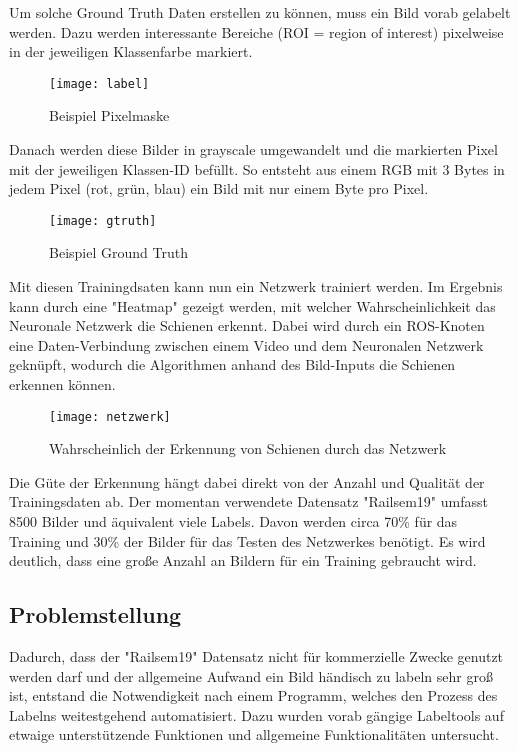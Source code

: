 \documentclass[11pt]{scrartcl}
\begin{document}
\noindent 
Um solche Ground Truth Daten erstellen zu können, muss ein Bild vorab gelabelt werden.  Dazu werden interessante Bereiche (ROI = region of interest) pixelweise in der jeweiligen Klassenfarbe markiert.

\begin{figure}[H]
  \texttt{[image: label]}
  \caption{Beispiel Pixelmaske}
\end{figure}
\newpage
\noindent 
Danach werden diese Bilder in grayscale umgewandelt und die markierten Pixel mit der jeweiligen Klassen-ID befüllt. So entsteht aus einem RGB mit 3 Bytes in jedem Pixel (rot, grün, blau) ein Bild mit nur einem Byte pro Pixel.

\begin{figure}[H]
  \texttt{[image: gtruth]}
  \caption{Beispiel Ground Truth}
\end{figure}
\noindent 
Mit diesen Trainingdsaten kann nun ein Netzwerk trainiert werden.
Im Ergebnis kann durch eine "Heatmap" gezeigt werden, mit welcher Wahrscheinlichkeit das Neuronale Netzwerk die Schienen erkennt. Dabei wird durch ein ROS-Knoten eine Daten-Verbindung zwischen einem Video und dem Neuronalen Netzwerk geknüpft, wodurch die Algorithmen anhand des Bild-Inputs die Schienen erkennen können.
\begin{figure}[H]
  \texttt{[image: netzwerk]}
  \caption{Wahrscheinlich der Erkennung von Schienen durch das Netzwerk}
\end{figure}
\noindent 
Die Güte der Erkennung hängt dabei direkt von der Anzahl und Qualität der Trainingsdaten ab. Der momentan verwendete Datensatz "Railsem19" umfasst 8500 Bilder und äquivalent viele Labels. Davon werden circa 70\% für das Training und 30\% der Bilder für das Testen des Netzwerkes benötigt. Es wird deutlich, dass eine große Anzahl an Bildern für ein Training gebraucht wird. 



\subsection{Problemstellung}
\label{sec:Problemstellung}

Dadurch, dass der "Railsem19" Datensatz nicht für kommerzielle Zwecke genutzt werden darf und der allgemeine Aufwand ein Bild händisch zu labeln sehr groß ist, entstand die Notwendigkeit nach einem Programm, welches den Prozess des Labelns weitestgehend automatisiert. Dazu wurden vorab gängige Labeltools auf etwaige unterstützende Funktionen und allgemeine Funktionalitäten untersucht.
\end{document}

